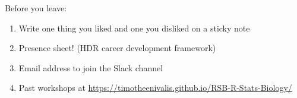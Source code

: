 \documentclass[12pt]{beamer}\usepackage[]{graphicx}\usepackage[]{color}
\begin{document}
\begin{frame}[standout]{}
  \begin{exampleblock}{Before you leave:}
  \begin{enumerate}
    \item Write one thing you liked and one you disliked on a sticky note
    \item Presence sheet! (HDR career development framework)
    \item Email address to join the Slack channel 
    \item Past workshops at \url{https://timotheenivalis.github.io/RSB-R-Stats-Biology/} 
  \end{enumerate}
\end{exampleblock}
\end{frame}
\end{document}
